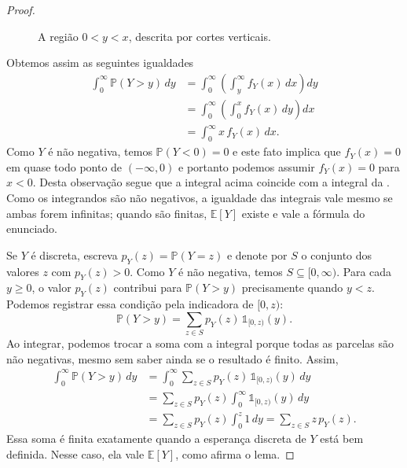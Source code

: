 \documentclass[12pt,portuguese]{article}
\theoremstyle{definition}
\theoremstyle{plainexercise}
\theoremstyle{starredexercise}
\theoremstyle{definition}
\begin{document}
\begin{proof}
\begin{figure}[H]
\caption{A região $0<y<x$, descrita por cortes verticais.}
\label{fig2:regiao-formula-cauda}
\end{figure}
Obtemos assim as seguintes igualdades
\begin{align*}
\int_{0}^{\infty} \mathbb{P}(Y > y)\,dy
&= \int_{0}^{\infty} \left(\int_{y}^{\infty} f_Y(x)\,dx\right)dy
\\[0.3cm]
&= \int_{0}^{\infty} \left( \int_{0}^{x} f_Y(x)\,dy \right) dx
\\[0.3cm]
&= \int_{0}^{\infty} x\, f_Y(x)\,dx.
\end{align*}
Como $Y$ é não negativa, temos $\mathbb{P}(Y < 0) = 0$ e 
este fato implica que $f_Y(x)=0$ em quase todo ponto de $(-\infty,0)$ e portanto podemos  
assumir $f_Y(x) = 0$ para $x < 0$. Desta observação segue que 
a integral acima coincide com a integral da
. Como os integrandos são não negativos,
a igualdade das integrais vale mesmo se ambas forem infinitas; quando
são finitas, $\mathbb{E}[Y]$ existe e vale a fórmula do enunciado.

\bigskip

Se $Y$ é discreta, escreva $p_Y(z)=\mathbb{P}(Y=z)$ e denote por $S$
o conjunto dos valores $z$ com $p_Y(z)>0$. Como $Y$ é não negativa,
temos $S\subseteq[0,\infty)$. Para cada $y\geqslant0$, o valor $p_{Y}(z)$
contribui para $\mathbb{P}(Y>y)$ precisamente quando $y<z$.
Podemos registrar essa condição pela indicadora de $[0,z)$:
\[
  \mathbb{P}(Y>y)
  =\sum_{z\in S}
  p_Y(z)\,\mathds{1}_{[0,z)}(y).
\]
Ao integrar, podemos trocar a soma com a integral porque todas as
parcelas são não negativas, mesmo sem saber ainda se o resultado é
finito. Assim,
\begin{align*}
  \int_0^\infty\mathbb{P}(Y>y)\,dy
  &=\int_0^\infty\sum_{z\in S}
    p_Y(z)\,\mathds{1}_{[0,z)}(y)\,dy
  \\[0.3cm]
  &=\sum_{z\in S}p_Y(z)
    \int_0^\infty\mathds{1}_{[0,z)}(y)\,dy
  \\[0.3cm]
  &=\sum_{z\in S}p_Y(z)\int_0^z 1\,dy
   =\sum_{z\in S}z\,p_Y(z).
\end{align*}
Essa soma é finita exatamente quando a esperança discreta de $Y$ está
bem definida. Nesse caso, ela vale $\mathbb{E}[Y]$, como afirma o lema.
\end{proof}
\end{document}
